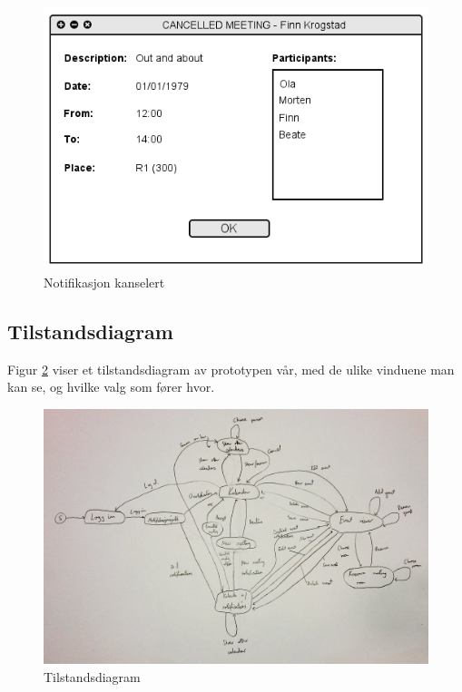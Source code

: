 \begin{figure}[H]
\centering
\includegraphics[scale=0.65]{images/notifikasjon_kanselert.png}
\caption{Notifikasjon kanselert}
\label{notifikasjon_kanselert_image}
\end{figure}


\subsection{Tilstandsdiagram}
Figur \ref{tilstandsdiagram_image} viser et tilstandsdiagram av prototypen vår, med de ulike vinduene man kan se, og hvilke valg som fører hvor.

\begin{figure}[H]
\centering
\includegraphics[scale=0.165]{images/tilstandsdiagram.jpg}
\caption{Tilstandsdiagram}
\label{tilstandsdiagram_image}
\end{figure}
